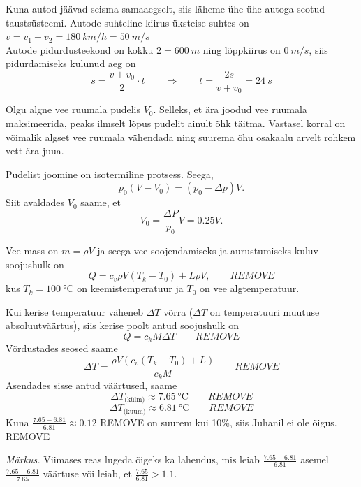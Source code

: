 \documentclass[10pt]{article}
\newcommand{\pp}[1]{REMOVE}
\begin{document}
\solu
Kuna autod jäävad seisma samaaegselt, siis läheme ühe ühe autoga seotud taustsüsteemi.
Autode suhteline kiirus üksteise suhtes on $v = v_1+v_2 = \SI{180}{km/h}=\SI{50}{m/s}$\\
Autode pidurdusteekond on kokku $2=\SI{600}{m}$ ning lõppkiirus on $\SI{0}{m/s}$, siis pidurdamiseks kulunud aeg on
\[ s = \frac{v + v_0}{2}\cdot t \quad\quad\Rightarrow\quad\quad t = \frac{2s}{v+v_0} = \SI{24}{s} \]
\probend
\bigskip


\solu
Olgu algne vee ruumala pudelis $V_0$. Selleks, et ära joodud vee ruumala maksimeerida, peaks ilmselt lõpus pudelit ainult õhk täitma. Vastasel korral on võimalik algset vee ruumala vähendada ning suurema õhu osakaalu arvelt rohkem vett ära juua.

Pudelist joomine on isotermiline protsess. Seega,
\[
p_0 (V-V_0)=(p_0-\Delta p)V.
\]
Siit avaldades $V_0$ saame, et
\[
V_0=\frac{\Delta P}{p_0} V = \num{0.25} V.
\]
\probend
\bigskip

\setAuthor{}

\solu
Vee mass on $m=\rho V$ ja seega vee soojendamiseks ja aurustumiseks kuluv soojushulk on
$$Q=c_v\rho V (T_k-T_0) + L\rho V, \qquad\pp{1}$$
kus $T_k = \SI{100}{\celsius}$ on keemistemperatuur ja $T_0$ on vee algtemperatuur.

Kui kerise temperatuur väheneb $\Delta T$ võrra ($\Delta T$ on temperatuuri muutuse absoluutväärtus), siis kerise poolt antud soojushulk on
$$Q=c_kM\Delta T \qquad \pp{1}$$
Võrdustades seosed saame
$$\Delta T = \frac{\rho V\left(c_v(T_k-T_0)+L\right)}{c_kM} \qquad\pp{1}$$
Asendades sisse antud väärtused, saame
$$\Delta T_{\text{(külm)}}\approx \SI{7.65}{\celsius} \qquad\pp{1}$$
$$\Delta T_{\text{(kuum)}}\approx \SI{6.81}{\celsius} \qquad\pp{1}$$
Kuna $\frac{\num{7.65}-\num{6.81}}{\num{6.81}}\approx \num{0.12}$ \pp{0,5} on suurem kui 10\%, siis Juhanil ei ole õigus. \pp{0,5}

\emph{Märkus.} Viimases reas lugeda õigeks ka lahendus, mis leiab $\frac{\num{7.65}-\num{6.81}}{\num{6.81}}$ asemel $\frac{\num{7.65}-\num{6.81}}{\num{7.65}}$ väärtuse või leiab, et $\frac{\num{7.65}}{\num{6.81}}>\num{1.1}$.
\probend
\bigskip

\setAuthor{}
\end{document}
